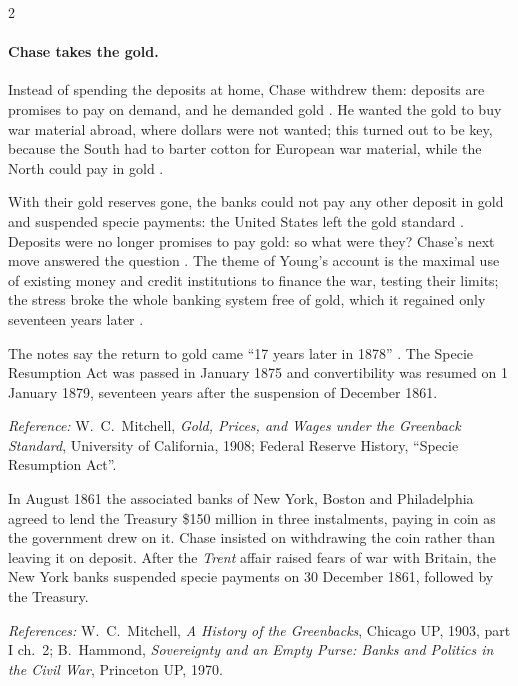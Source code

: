 \begin{paracol}{2}
\paragraph{Chase takes the gold.} Instead of spending the deposits at home, Chase withdrew them: deposits are promises to pay on
demand, and he demanded gold . He wanted the gold to buy war material abroad, where dollars were not
wanted; this turned out to be key, because the South had to barter cotton for European war material, while the North could pay
in gold .
\begin{taccts}
\qquad
{}
\end{taccts}
With their gold reserves gone, the banks could not pay any other deposit in gold and suspended specie payments: the United States
left the gold standard . Deposits were no longer promises to pay gold: so what were they? Chase's next move answered the
question . The theme of Young's account is the maximal use of existing money and credit institutions to finance the war, testing their
limits; the stress broke the whole banking system free of gold, which it regained only seventeen years later .

\begin{coursenote}
The notes say the return to gold came ``17 years later in 1878'' . The Specie Resumption Act was passed in January 1875 and convertibility
was resumed on 1 January 1879, seventeen years after the suspension of December 1861.\par
\emph{Reference:} W.~C.~Mitchell, \emph{Gold, Prices, and Wages under the Greenback Standard}, University of California, 1908; Federal Reserve
History, ``Specie Resumption Act''.
\end{coursenote}

\begin{history}
In August 1861 the associated banks of New York, Boston and Philadelphia agreed to lend the Treasury \$150 million in three
instalments, paying in coin as the government drew on it. Chase insisted on withdrawing the coin rather than leaving it on deposit.
After the \emph{Trent} affair raised fears of war with Britain, the New York banks suspended specie payments on 30 December 1861,
followed by the Treasury.\par
\emph{References:} W.~C.~Mitchell, \emph{A History of the Greenbacks}, Chicago UP, 1903, part I ch.~2; B.~Hammond,
\emph{Sovereignty and an Empty Purse: Banks and Politics in the Civil War}, Princeton UP, 1970.
\end{history}


\end{paracol}
